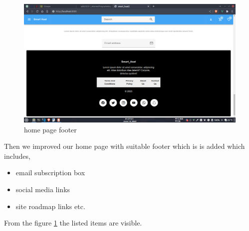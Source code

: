 \documentclass[a4paper,12pt]{report}
\begin{document}
\begin{figure}[]
	\includegraphics[keepaspectratio, width=\linewidth]{footer.png}
	\caption{home page footer}
	\label{footer}
\end{figure}
Then we improved our home page with suitable footer which is  is added which includes,
\begin{itemize}
	\item email subscription box
	\item social media links
	\item site roadmap links etc.
\end{itemize}
From the figure \ref{footer} the listed items are visible.
\end{document}
